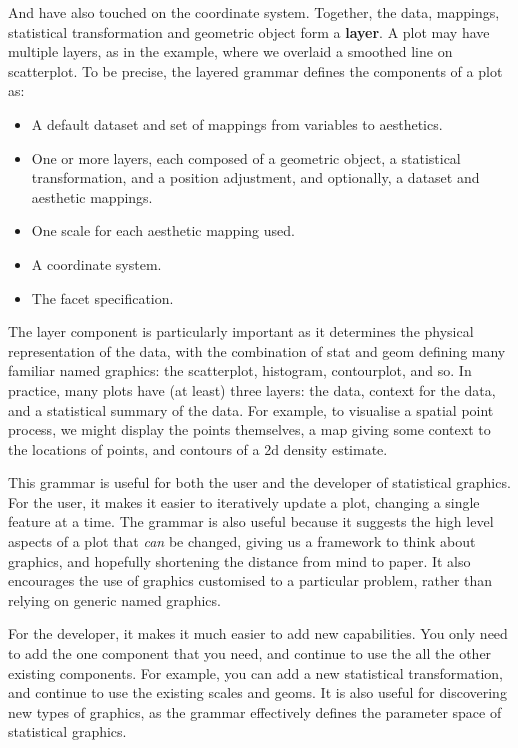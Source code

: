 \noindent And have also touched on the coordinate system.  Together, the data, mappings, statistical transformation and geometric object form a {\bf layer}.  A plot may have multiple layers, as in the example, where we overlaid a  smoothed line on scatterplot.  To be precise, the layered grammar defines the components of a plot as:

\begin{itemize}
  \item A default dataset and set of mappings from variables to aesthetics.
  \item One or more layers, each composed of a geometric object, a statistical transformation, and a position adjustment, and optionally, a dataset and aesthetic mappings.
  \item One scale for each aesthetic mapping used.
  \item A coordinate system.
  \item The facet specification.
\end{itemize}


The layer component is particularly important as it determines the physical representation of the data, with the combination of stat and geom defining many familiar named graphics: the scatterplot, histogram, contourplot, and so.  In practice, many plots have (at least) three layers: the data, context for the data, and a statistical summary of the data.  For example, to visualise a  spatial point process, we might display the points themselves, a map giving some context to the locations of points, and contours of a 2d density estimate.

This grammar is useful for both the user and the developer of statistical graphics.  For the user, it makes it easier to iteratively update a plot, changing a single feature at a time.  The grammar is also useful because it suggests the high level aspects of a plot that \emph{can} be changed, giving us a framework to think about graphics, and hopefully shortening the distance from mind to paper.  It also encourages the use of graphics customised to a particular problem, rather than relying on generic named graphics.

For the developer, it makes it much easier to add new capabilities. You only need to add the one component that you need, and continue to use the all the other existing components.  For example, you can add a new statistical transformation, and continue to use the existing scales and geoms.  It is also useful for discovering new types of graphics, as the grammar effectively defines the parameter space of statistical graphics.

